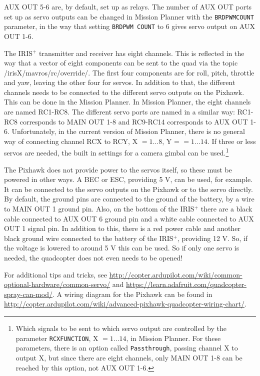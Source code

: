 \documentclass[titlepage,11pt,a4paper]{article}
\begin{document}
AUX OUT 5-6 are, by default, set up as relays. The number of AUX OUT
ports set up as servo outputs can be changed in Mission Planner with
the \texttt{BRD\textunderscore PWM\textunderscore COUNT} parameter, in
the way that setting \texttt{BRD\textunderscore PWM\textunderscore
 COUNT} to 6 gives servo output on AUX OUT 1-6.

The IRIS$^+$ transmitter and receiver has eight channels. This is
reflected in the way that a vector of eight components can be sent to
the quad via the topic /irisX/mavros/rc/override/. The first four
components are for roll, pitch, throttle and yaw, leaving the other
four for servos. In addition to that, the different channels needs to
be connected to the different servo outputs on the Pixhawk. This can
be done in the Mission Planner. In Mission Planner, the eight channels
are named RC1-RC8. The different servo ports are named in a similar
way: RC1-RC8 corresponds to MAIN OUT 1-8 and RC9-RC14 corresponds to
AUX OUT 1-6. Unfortunately, in the current version of Mission Planner,
there is no general way of connecting channel RCX to RCY, X $= 1 \dots
8$, Y = $= 1 \dots 14$. If three or less servos are needed, the built
in settings for a camera gimbal can be used.\footnote{Which signals to
be sent to which servo output are controlled by the parameter
\texttt{RCX\textunderscore FUNCTION}, X $= 1 \dots 14$, in Mission
Planner. For these parameters, there is an option called
\texttt{Passthrough}, passing channel X to output X, but since there
are eight channels, only MAIN OUT 1-8 can be reached by this option,
not AUX OUT 1-6.}

The Pixhawk does not provide power to the servos itself, so these must
be powered in other ways. A BEC or ESC, providing 5 V, can be used,
for example. It can be connected to the servo outputs on the Pixhawk
or to the servo directly. By default, the ground pins are connected to
the ground of the battery, by a wire to MAIN OUT 1 ground pin. Also,
on the bottom of the IRIS$^+$ there are a black cable connected to AUX
OUT 6 ground pin and a white cable connected to AUX OUT 1 signal
pin. In addition to this, there is a red power cable and another black
ground wire connected to the battery of the IRIS$^+$, providing 12
V. So, if the voltage is lowered to around 5 V this can be used. So if
only one servo is needed, the quadcopter does not even needs to be
opened!

For additional tips and tricks, see
\url{http://copter.ardupilot.com/wiki/common-optional-hardware/common-servo/}
and \url{https://learn.adafruit.com/quadcopter-spray-can-mod/}. A
wiring diagram for the Pixhawk can be found in
\url{http://copter.ardupilot.com/wiki/advanced-pixhawk-quadcopter-wiring-chart/}.
\end{document}

